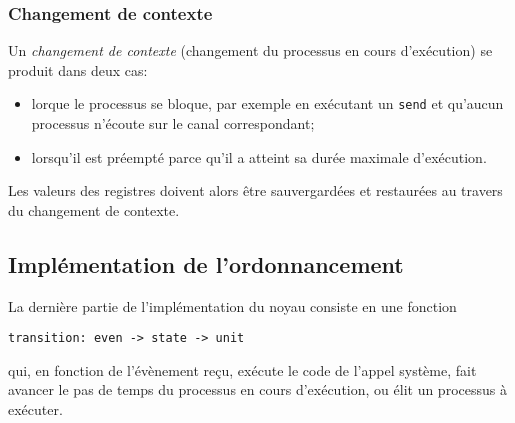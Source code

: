 \documentclass[french, toc]{../cs-classes/cs-classes}
\begin{document}
\subsubsection{Changement de contexte}
Un \emph{changement de contexte} (changement du processus en cours d'exécution) se produit dans deux cas:
\begin{itemize}
    \item lorque le processus se bloque, par exemple en exécutant un \texttt{send} et qu'aucun processus n'écoute sur le canal correspondant;
    \item lorsqu'il est préempté parce qu'il a atteint sa durée maximale d'exécution.
\end{itemize}
Les valeurs des registres doivent alors être sauvergardées et restaurées au travers du changement de contexte.

\subsection{Implémentation de l'ordonnancement}
La dernière partie de l'implémentation du noyau consiste en une fonction
\begin{center}
    \texttt{transition: even -> state -> unit}
\end{center}
qui, en fonction de l'évènement reçu, exécute le code de l'appel système, fait avancer le pas de temps du processus en cours d'exécution, ou élit un processus à exécuter. 
\end{document}
